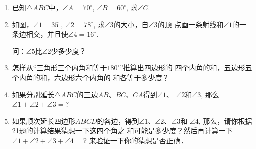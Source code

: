 \begin{enumerate}
\begin{figure}[htp]\centering
    \begin{minipage}[t]{0.48\textwidth}
    \centering
{}
    \caption*{第17题}
    \end{minipage}
    \begin{minipage}[t]{0.48\textwidth}
    \centering
    \caption*{第19题}
    \end{minipage}
    \end{figure}

\item 已知$\triangle ABC$中，$\angle A=70^{\circ}$, $\angle B=60^{\circ}$, 求$\angle C$.
\item 如图，$\angle 1=35^{\circ}$, $\angle 2=78^{\circ}$, 求$\angle 3$的大小，自$\angle 3$的顶
点画一条射线和$\angle 1$的一条边相交，并且使$\angle 4=16^{\circ}$.

问：$\angle 5$比$\angle 2$少多少度？

\item 怎样从“三角形三个内角和等于$180^{\circ}$”推算出四边形的
四个内角的和，五边形五个内角的和，六边形六个内角的
和各等于多少度？
\item 如果分别延长$\triangle ABC$的三边$\overline{AB}$、$\overline{BC}$、$\overline{CA}$得到$\angle 1$、
$\angle 2$和$\angle 3$, 那么$\angle 1+\angle 2+\angle 3=?$
\item 如果顺次延长四边形$ABCD$的各边，得到$\angle 1$、$\angle 2$、$\angle 3$和
$\angle 4$, 那么，请你根据21题的计算结果猜想一下这四个角之
和可能是多少度？然后再计算一下$\angle 1+\angle 2+\angle 3+\angle 4=?$
来验证一下你的猜想是否正确．


\end{enumerate}
